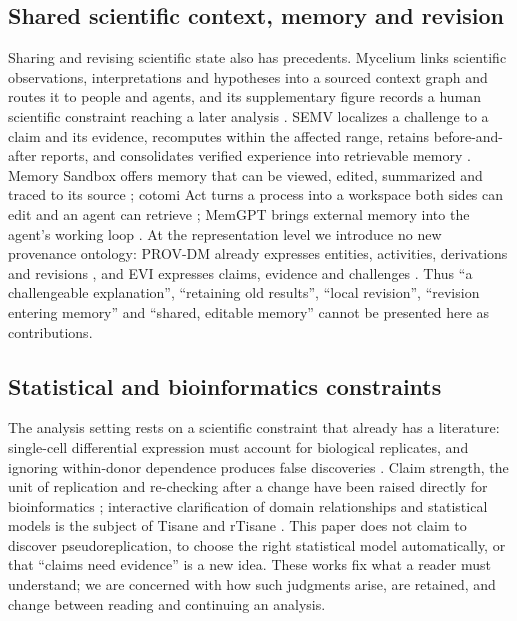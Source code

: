 \documentclass[11pt]{article}
\begin{document}
\subsection{Shared scientific context, memory and revision}\label{rw-shared}

Sharing and revising scientific state also has precedents. Mycelium links scientific observations, interpretations and hypotheses into a sourced context graph and routes it to people and agents, and its supplementary figure records a human scientific constraint reaching a later analysis \cite{mycelium}. SEMV localizes a challenge to a claim and its evidence, recomputes within the affected range, retains before-and-after reports, and consolidates verified experience into retrievable memory \cite{semv}. Memory Sandbox offers memory that can be viewed, edited, summarized and traced to its source \cite{memorysandbox}; cotomi Act turns a process into a workspace both sides can edit and an agent can retrieve \cite{cotomi}; MemGPT brings external memory into the agent's working loop \cite{memgpt}. At the representation level we introduce no new provenance ontology: PROV-DM already expresses entities, activities, derivations and revisions \cite{prov}, and EVI expresses claims, evidence and challenges \cite{evi}. Thus ``a challengeable explanation'', ``retaining old results'', ``local revision'', ``revision entering memory'' and ``shared, editable memory'' cannot be presented here as contributions.

\subsection{Statistical and bioinformatics constraints}\label{rw-stats}

The analysis setting rests on a scientific constraint that already has a literature: single-cell differential expression must account for biological replicates, and ignoring within-donor dependence produces false discoveries \cite{squair2021}. Claim strength, the unit of replication and re-checking after a change have been raised directly for bioinformatics \cite{trustworthy}; interactive clarification of domain relationships and statistical models is the subject of Tisane and rTisane \cite{tisane,rtisan}. This paper does not claim to discover pseudoreplication, to choose the right statistical model automatically, or that ``claims need evidence'' is a new idea. These works fix what a reader must understand; we are concerned with how such judgments arise, are retained, and change between reading and continuing an analysis.
\end{document}
